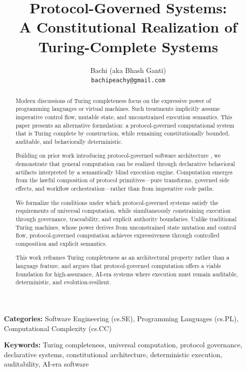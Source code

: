 \documentclass[11pt,a4paper]{article}
\title{Protocol-Governed Systems:\\A Constitutional Realization of Turing-Complete Systems}
\author{Bachi (aka Bhash Ganti)\\
\texttt{bachipeachy@gmail.com}}
\date{}
\begin{document}
\maketitle

\begin{abstract}
Modern discussions of Turing completeness focus on the expressive power of programming languages or virtual machines. Such treatments implicitly assume imperative control flow, mutable state, and unconstrained execution semantics. This paper presents an alternative formulation: a protocol-governed computational system that is Turing complete by construction, while remaining constitutionally bounded, auditable, and behaviorally deterministic.

Building on prior work introducing protocol-governed software architecture \citep{bachi2026protocol}, we demonstrate that general computation can be realized through declarative behavioral artifacts interpreted by a semantically blind execution engine. Computation emerges from the lawful composition of protocol primitives---pure transforms, governed side effects, and workflow orchestration---rather than from imperative code paths.

We formalize the conditions under which protocol-governed systems satisfy the requirements of universal computation, while simultaneously constraining execution through governance, traceability, and explicit authority boundaries. Unlike traditional Turing machines, whose power derives from unconstrained state mutation and control flow, protocol-governed computation achieves expressiveness through controlled composition and explicit semantics.

This work reframes Turing completeness as an architectural property rather than a language feature, and argues that protocol-governed computation offers a viable foundation for high-assurance, AI-era systems where execution must remain auditable, deterministic, and evolution-resilient.
\end{abstract}

\noindent\textbf{Categories:} Software Engineering (cs.SE), Programming Languages (cs.PL), Computational Complexity (cs.CC)

\noindent\textbf{Keywords:} Turing completeness, universal computation, protocol governance, declarative systems, constitutional architecture, deterministic execution, auditability, AI-era software


\end{document}
